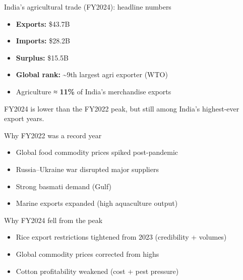 \documentclass[
  ignorenonframetext,
  aspectratio=169,
]{beamer}
\makeatletter
\providecommand{\tightlist}{%
  \setlength{\itemsep}{0pt}\setlength{\parskip}{0pt}}
\let\quarto@originallabel\label
\DeclareRobustCommand*{\label}[1]{\quarto@originallabel{#1}}
\makeatother
\begin{document}
\begin{frame}
\begin{block}{India's agricultural trade (FY2024): headline numbers}
\label{indias-agricultural-trade-fy2024-headline-numbers}
\begin{itemize}
\tightlist
\item
  \textbf{Exports:} \$43.7B
\item
  \textbf{Imports:} \$28.2B
\item
  \textbf{Surplus:} \$15.5B
\item
  \textbf{Global rank:} \textasciitilde9th largest agri exporter (WTO)
\item
  Agriculture ≈ \textbf{11\%} of India's merchandise exports
\end{itemize}

FY2024 is lower than the FY2022 peak, but still among India's
highest-ever export years.
\end{block}
\end{frame}

\begin{frame}
\begin{block}{Why FY2022 was a record year}
\label{why-fy2022-was-a-record-year}
\begin{itemize}
\tightlist
\item
  Global food commodity prices spiked post-pandemic
\item
  Russia--Ukraine war disrupted major suppliers
\item
  Strong basmati demand (Gulf)
\item
  Marine exports expanded (high aquaculture output)
\end{itemize}
\end{block}
\end{frame}

\begin{frame}
\begin{block}{Why FY2024 fell from the peak}
\label{why-fy2024-fell-from-the-peak}
\begin{itemize}
\tightlist
\item
  Rice export restrictions tightened from 2023 (credibility + volumes)
\item
  Global commodity prices corrected from highs
\item
  Cotton profitability weakened (cost + pest pressure)
\end{itemize}
\end{block}
\end{frame}
\end{document}
